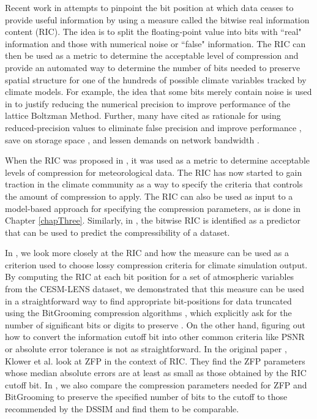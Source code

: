  
 
 Recent work in \cite{klower} attempts to pinpoint the bit position at which data ceases to provide useful information by using a measure called the bitwise real information content (RIC). The idea is to split the floating-point value into bits with ``real" information and those with numerical noise or ``false" information. The RIC can then be used as a metric to determine the acceptable level of compression and provide an automated way to determine the number of bits needed to preserve spatial structure for one of the hundreds of possible climate variables tracked by climate models. For example, the idea that some bits merely contain noise is used in \cite{PhysRevE.106.015308} to justify reducing the numerical precision to improve performance of the lattice Boltzman Method. Further, many have cited \cite{klower} as rationale for using reduced-precision values to eliminate false precision and improve performance \cite{9912702}, save on storage space \cite{Huang2023}, and lessen demands on network bandwidth \cite{10279204}. 
 
 When the RIC was proposed in \cite{klower}, it was used as a metric to determine acceptable levels of compression for meteorological data. The RIC has now started to gain traction in the climate community as a way to specify the criteria that controls the amount of compression to apply. The RIC can also be used as input to a model-based approach for specifying the compression parameters, as is done in Chapter \ref{chapThree}.  Similarly, in \cite{cappello19}, the bitwise RIC is identified as a predictor that can be used to predict the compressibility of a dataset.

 In \cite{drbsd_real}, we look more closely at the RIC and how the measure can be used as a criterion used to choose lossy compression criteria for climate simulation output. By computing the RIC at each bit position for a set of atmospheric variables from the CESM-LENS dataset, we demonstrated that this measure can be used in a straightforward way to find appropriate bit-positions for data truncated using the BitGrooming compression algorithms \cite{zender2016}, which explicitly ask for the number of significant bits or digits to preserve . On the other hand, figuring out how to convert the information cutoff bit into other common criteria like PSNR or absolute error tolerance is not as straightforward. In the original paper \cite{klower}, Klower et al. look at ZFP\cite{lindstrom2014} in the context of RIC. They find the ZFP parameters whose median absolute errors are at least as small as those obtained by the RIC cutoff bit. In \cite{drbsd_real}, we also compare the compression parameters needed for ZFP and BitGrooming to preserve the specified number of bits to the cutoff to those recommended by the DSSIM \cite{dssim_paper} and find them to be comparable. 


